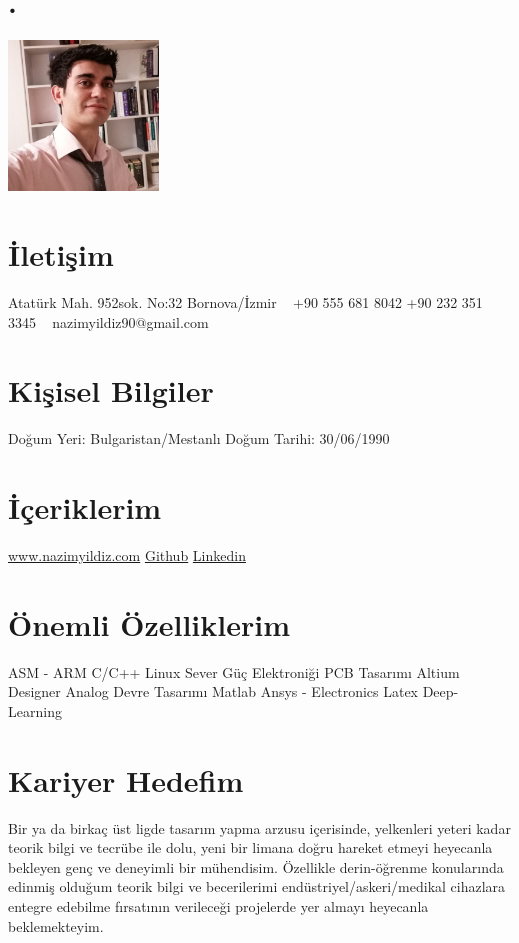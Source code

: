 \documentclass[]{cv-style} %
\begin{document}
\begin{aside}
\section{.}
\includegraphics[width=4cm]{photo.jpg}
\section{İletişim}
Atatürk Mah.
952sok. No:32
Bornova/İzmir
~
+90 555 681 8042
+90 232 351 3345
~
nazimyildiz90@gmail.com
\section{Kişisel Bilgiler}
Doğum Yeri: Bulgaristan/Mestanlı
\hspace{0.2mm}
Doğum Tarihi: 30/06/1990
\section{İçeriklerim}
\href{www.nazimyildiz.com}{www.nazimyildiz.com}
\href{https://github.com/namcho}{Github}
\href{https://www.linkedin.com/in/naz%C4%B1m-y%C4%B1ld%C4%B1z-a67b0344/}{Linkedin}
\section{Önemli Özelliklerim}
ASM - ARM
C/C++
Linux Sever
Güç Elektroniği
PCB Tasarımı
Altium Designer
Analog Devre Tasarımı
Matlab
Ansys - Electronics
Latex
Deep-Learning
\end{aside}
\section{Kariyer Hedefim}
  \vspace{-0.2cm}
Bir ya da birkaç üst ligde tasarım yapma arzusu içerisinde, yelkenleri yeteri kadar teorik bilgi ve tecrübe ile dolu, yeni bir limana doğru hareket etmeyi heyecanla bekleyen genç ve deneyimli bir mühendisim. Özellikle derin-öğrenme konularında edinmiş olduğum teorik bilgi ve becerilerimi endüstriyel/askeri/medikal cihazlara entegre edebilme fırsatının verileceği projelerde yer almayı heyecanla beklemekteyim.
\end{document}
